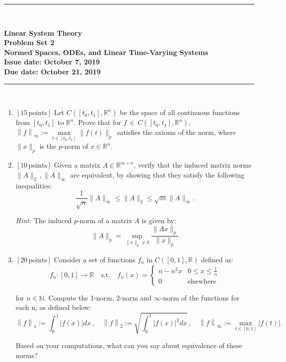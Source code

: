 \documentclass[a4paper,10.5pt]{article}
\newcommand{\R}{\mathbb{R}}
\newcommand{\N}{\mathbb{N}}
\begin{document}
\thispagestyle{plain}

\vspace*{-1.5cm}
\noindent \rule{15.8cm}{.3mm} \\[.3cm]
\begin{center} \bf
{\large Linear System Theory \medskip \\
Problem Set 2 \\
Normed Spaces, ODEs, and Linear Time-Varying Systems \medskip \\
Issue date: October 7, 2019 \\
Due date: October 21, 2019}
\end{center}
\noindent \rule{15.8cm}{.3mm} \\[0cm]

\begin{enumerate}
\item {\bf$[15\, \text{points}]$}
Let $C([t_0, t_1], \R^n)$ be the space of all continuous functions from $[t_0, t_1]$ to $\R^n$. Prove that for $f \, \in \, C([t_0, t_1], \R^n)$,
 $\left\lVert f \right\rVert_\infty := \max\limits_{t \in [t_0, t_1]} \|f(t)\|_p \, $ satisfies the axioms of the norm, where $\|x\|_p$ is the $p$-norm of $x \in \R^n$.
 
\item {\bf$[10\, \text{points}]$}
Given a matrix $A \in \R^{m \times n}$, verify that the induced matrix norms $\|A\|_2 \, ,\|A\|_\infty$ are equivalent, by showing that they satisfy the following inequalities:
\begin{displaymath}
\dfrac{1}{\sqrt{n}} \|A\|_\infty \leq \|A\|_2 \leq \sqrt{m} \|A\|_\infty.
\end{displaymath}

{\em Hint:} The induced $p$-norm of a matrix $A$ is given by:
\begin{displaymath}
\|A\|_p=\sup\limits_{\|x\|_p \neq 0} \dfrac{\|Ax\|_p}{\|x\|_p}
\end{displaymath}

\item {\bf$[20\, \text{points}]$}
Consider a set of functions $f_n$ in $C([0,1], \R)$ defined as:
\begin{displaymath}
f_n:[0,1] \rightarrow \R \quad\text{s.t.}\quad
f_n(x) = 
\begin{cases}
n -n^2x & 0\leq x\leq \frac{1}{n}\\
0 & \text{elsewhere}
\end{cases}
\end{displaymath}

for $n\in\N$. Compute the 1-norm, 2-norm and $\infty$-norm of the functions for each n, as defined below:
\begin{displaymath}
\left\lVert f \right\rVert_1 := \int_0^1 \left\lvert f(x) \right\rvert dx\, , \quad
\left\lVert f \right\rVert_2 := \sqrt{\int_0^1 \left\lvert f(x) \right\rvert^2 dx}\, , \quad
\left\lVert f \right\rVert_\infty := \max\limits_{t \in [0, 1]} |f(t)|.
\end{displaymath}

Based on your computations, what can you say about equivalence of these norms?  
\end{enumerate} 
\end{document}
